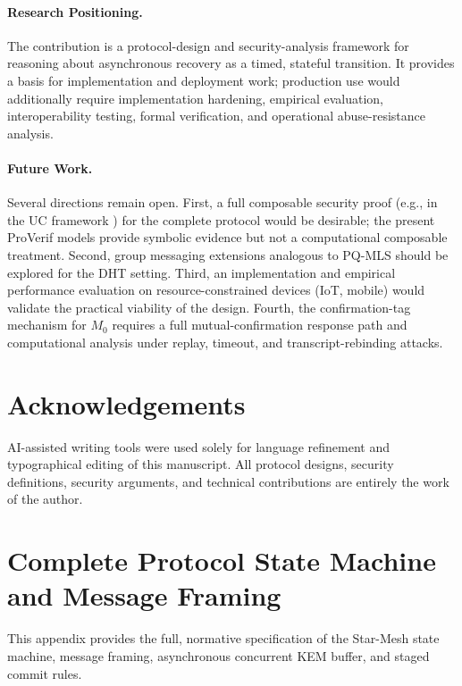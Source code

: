 \documentclass[11pt,a4paper]{article}
\theoremstyle{remark}
\theoremstyle{plain}
\begin{document}
\paragraph{Research Positioning.}
The contribution is a protocol-design and security-analysis framework for reasoning about
asynchronous recovery as a timed, stateful transition.  It provides a basis for implementation
and deployment work; production use would additionally require implementation hardening,
empirical evaluation, interoperability testing, formal verification, and operational
abuse-resistance analysis.

\paragraph{Future Work.}
Several directions remain open.  First, a full composable security proof (e.g., in the UC
framework \cite{uc_framework}) for the complete protocol would be desirable; the present
ProVerif models provide symbolic evidence but not a computational composable treatment.
Second, group messaging extensions analogous to PQ-MLS \cite{rfc9420} should be explored
for the DHT setting.  Third, an implementation and empirical performance evaluation on
resource-constrained devices (IoT, mobile) would validate the practical viability of the
design.  Fourth, the confirmation-tag mechanism for $M_0$ requires a full mutual-confirmation
response path and computational analysis under replay, timeout, and transcript-rebinding attacks.

\section*{Acknowledgements}
AI-assisted writing tools were used solely for language refinement and typographical editing of this manuscript.
All protocol designs, security definitions, security arguments, and technical contributions are
entirely the work of the author.

\appendix
\section{Complete Protocol State Machine and Message Framing}
\label{sec:appendix-statemachine}

This appendix provides the full, normative specification of the Star-Mesh state machine,
message framing, asynchronous concurrent KEM buffer, and staged commit rules.
\end{document}
